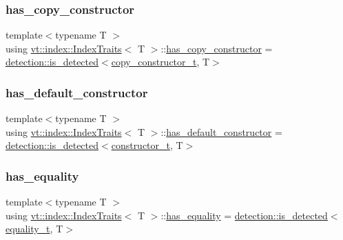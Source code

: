 \subsubsection{\texorpdfstring{has\+\_\+copy\+\_\+constructor}{has\_copy\_constructor}}
{\footnotesize\ttfamily template$<$typename T $>$ \\
using \hyperlink{structvt_1_1index_1_1_index_traits}{vt\+::index\+::\+Index\+Traits}$<$ T $>$\+::\hyperlink{structvt_1_1index_1_1_index_traits_a7440b1a34592c08fcd93fd9a39ffbfa7}{has\+\_\+copy\+\_\+constructor} =  \hyperlink{namespacedetection_a30893549a3de1e9603d78dad6d5dce92}{detection\+::is\+\_\+detected}$<$\hyperlink{structvt_1_1index_1_1_index_traits_ad99299628a662db3cfa5021b810e8846}{copy\+\_\+constructor\+\_\+t}, T$>$}

\mbox{\label{structvt_1_1index_1_1_index_traits_a583c6d370e78ca2c8b9fc67bd2d1d942}} 
\subsubsection{\texorpdfstring{has\+\_\+default\+\_\+constructor}{has\_default\_constructor}}
{\footnotesize\ttfamily template$<$typename T $>$ \\
using \hyperlink{structvt_1_1index_1_1_index_traits}{vt\+::index\+::\+Index\+Traits}$<$ T $>$\+::\hyperlink{structvt_1_1index_1_1_index_traits_a583c6d370e78ca2c8b9fc67bd2d1d942}{has\+\_\+default\+\_\+constructor} =  \hyperlink{namespacedetection_a30893549a3de1e9603d78dad6d5dce92}{detection\+::is\+\_\+detected}$<$\hyperlink{structvt_1_1index_1_1_index_traits_a752bed91b021dff94a5b2863442e07c9}{constructor\+\_\+t}, T$>$}

\mbox{\label{structvt_1_1index_1_1_index_traits_abd8f9e796291242c027dd33d9a21acab}} 
\subsubsection{\texorpdfstring{has\+\_\+equality}{has\_equality}}
{\footnotesize\ttfamily template$<$typename T $>$ \\
using \hyperlink{structvt_1_1index_1_1_index_traits}{vt\+::index\+::\+Index\+Traits}$<$ T $>$\+::\hyperlink{structvt_1_1index_1_1_index_traits_abd8f9e796291242c027dd33d9a21acab}{has\+\_\+equality} =  \hyperlink{namespacedetection_a30893549a3de1e9603d78dad6d5dce92}{detection\+::is\+\_\+detected}$<$\hyperlink{structvt_1_1index_1_1_index_traits_a87c63bbffab452de516eb2dbc93c07e3}{equality\+\_\+t}, T$>$}

